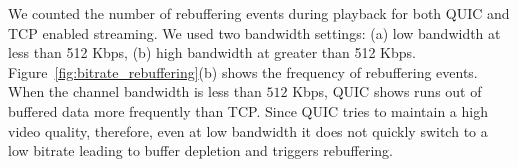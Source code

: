 
We counted the number of rebuffering events during playback for both QUIC and TCP enabled streaming.
We used two bandwidth settings: (a) low bandwidth at less than 512 Kbps, (b) high bandwidth at greater than 512 Kbps.
Figure~\ref{fig:bitrate_rebuffering}(b) shows the frequency of rebuffering events.
When the channel bandwidth is less than $512$ Kbps, QUIC shows runs out of buffered data more frequently than TCP. 
Since QUIC tries to maintain a high video quality, therefore, even at low bandwidth it does not quickly switch to a low bitrate leading to buffer depletion and triggers rebuffering.


